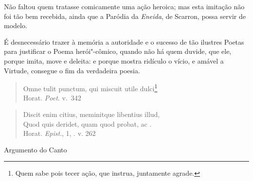 Não faltou quem tratasse comicamente uma ação heroica; 
mas esta imitação não foi tão bem recebida, ainda que a 
Paródia da \textit{Eneida}, de Scarron, possa servir de modelo. 

É desnecessário trazer à memória a autoridade e o 
sucesso de tão ilustres Poetas para justificar o Poema 
herói"-cômico, quando não há quem duvide, que ele, 
porque imita, move e deleita: e porque mostra ridículo o 				\index{\Util}
vício, e amável a Virtude, consegue o fim da verdadeira poesia.

\begin{verse}
Omne tulit punctum, qui miscuit utile dulci\footnote{ Quem sabe pois
tecer ação, que instrua, juntamente agrade.}\\[10pt]

\hfill Horat. \textit{Poet}. v.~342 
\end{verse}

\begin{verse}
Discit enim citius, meminitque libentius illud,\\

Quod quis deridet, quam quod probat, ac . 
\\[10pt]

\hfill Horat. \textit{Epist}., 1, . v. 262
\end{verse}

\pagebreak
\paginabranca

\mbox{}\vfill
\thispagestyle{empty}
\noindent Argumento do Canto 
\medskip

